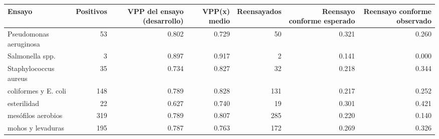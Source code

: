 \begin{tabular}{lrrrrrr}
\toprule
Ensayo & Positivos & VPP del ensayo (desarrollo) & VPP(x) medio & Reensayados & Reensayo conforme esperado & Reensayo conforme observado \\
\midrule
Pseudomonas aeruginosa & 53 & 0.802 & 0.729 & 50 & 0.321 & 0.260 \\
Salmonella spp. & 3 & 0.897 & 0.917 & 2 & 0.141 & 0.000 \\
Staphylococcus aureus & 35 & 0.734 & 0.827 & 32 & 0.218 & 0.344 \\
coliformes y E. coli & 148 & 0.789 & 0.828 & 131 & 0.217 & 0.252 \\
esterilidad & 22 & 0.627 & 0.740 & 19 & 0.301 & 0.421 \\
mesófilos aerobios & 319 & 0.789 & 0.807 & 285 & 0.220 & 0.140 \\
mohos y levaduras & 195 & 0.787 & 0.763 & 172 & 0.269 & 0.326 \\
\bottomrule
\end{tabular}
